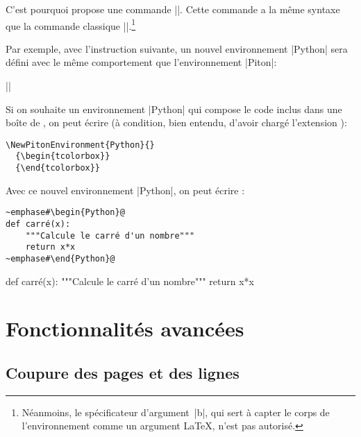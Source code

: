 \documentclass[dvipsnames,svgnames]{article}
\begin{document}
C'est pourquoi  propose une commande |\NewPitonEnvironment|. Cette commande a la même syntaxe que la
commande classique |\NewDocumentEnvironment|.\footnote{Néanmoins, le spécificateur d'argument~|b|, qui sert à
  capter le corps de l'environnement comme un argument LaTeX, n'est pas autorisé.}

\bigskip
Par exemple, avec l'instruction suivante, un nouvel environnement |{Python}| sera défini avec le même comportement
que l'environnement |{Piton}|:

{\color{gray}||}

\bigskip
Si on souhaite un environnement |{Python}| qui compose le code inclus dans une boîte de , on peut
écrire (à condition, bien entendu, d'avoir chargé l'extension ):

\begin{Verbatim}
\NewPitonEnvironment{Python}{}
  {\begin{tcolorbox}}
  {\end{tcolorbox}}
\end{Verbatim}

\bigskip
Avec ce nouvel environnement |{Python}|, on peut écrire : 

\begin{Verbatim}
~emphase#\begin{Python}@
def carré(x):
    """Calcule le carré d'un nombre"""
    return x*x
~emphase#\end{Python}@
\end{Verbatim}

  {\begin{tcolorbox}}
  {\end{tcolorbox}}

\begin{Python}
def carré(x):
    """Calcule le carré d'un nombre"""
    return x*x
\end{Python}


\section{Fonctionnalités avancées}


\subsection{Coupure des pages et des lignes}

\label{breakable}
\end{document}

